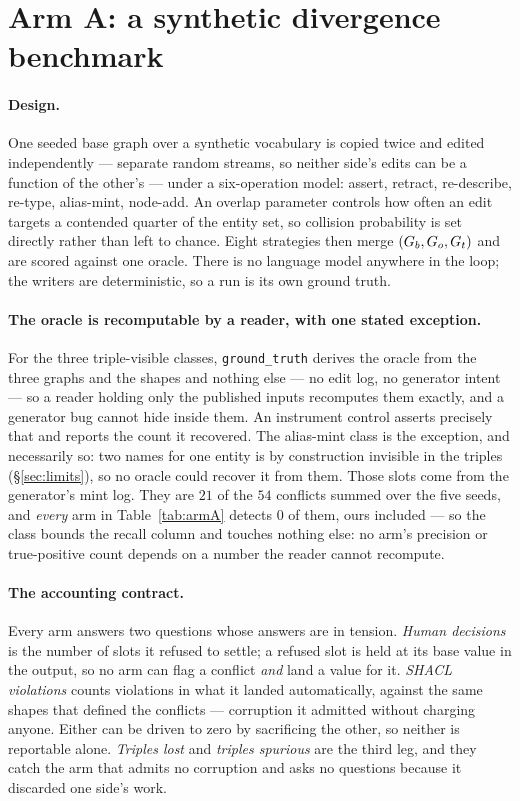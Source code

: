 \section{Arm A: a synthetic divergence benchmark}
\label{sec:synthetic}

\paragraph{Design.} One seeded base graph over a synthetic vocabulary is copied
twice and edited independently --- separate random streams, so neither side's
edits can be a function of the other's --- under a six-operation model: assert,
retract, re-describe, re-type, alias-mint, node-add. An overlap parameter
controls how often an edit targets a contended quarter of the entity set, so
collision probability is set directly rather than left to chance. Eight
strategies then merge $(G_{b}, G_{o}, G_{t})$ and are scored against one
oracle. There is no language model anywhere in the loop; the writers are
deterministic, so a run is its own ground truth.

\paragraph{The oracle is recomputable by a reader, with one stated exception.}
For the three triple-visible classes, \texttt{ground\_truth} derives the oracle
from the three graphs and the shapes and nothing else --- no edit log, no
generator intent --- so a reader holding only the published inputs recomputes
them exactly, and a generator bug cannot hide inside them. An instrument control
asserts precisely that and reports the count it recovered. The alias-mint class
is the exception, and necessarily so: two names for one entity is by
construction invisible in the triples (\S\ref{sec:limits}), so no oracle could
recover it from them. Those slots come from the generator's mint log. They are
$21$ of the $54$ conflicts summed over the five seeds, and \emph{every} arm in
Table~\ref{tab:armA} detects $0$ of them, ours included --- so the class bounds
the recall column and touches nothing else: no arm's precision or
true-positive count depends on a number the reader cannot recompute.

\paragraph{The accounting contract.} Every arm answers two questions whose
answers are in tension. \emph{Human decisions} is the number of slots it refused
to settle; a refused slot is held at its base value in the output, so no arm can
flag a conflict \emph{and} land a value for it. \emph{SHACL violations} counts
violations in what it landed automatically, against the same shapes that defined
the conflicts --- corruption it admitted without charging anyone. Either can be
driven to zero by sacrificing the other, so neither is reportable alone.
\emph{Triples lost} and \emph{triples spurious} are the third leg, and they
catch the arm that admits no corruption and asks no questions because it
discarded one side's work.

